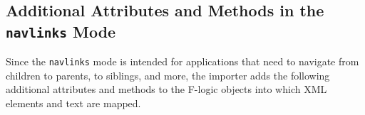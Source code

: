 

\subsection{Additional Attributes and Methods in the
  \texttt{navlinks} Mode }

Since the \texttt{navlinks} mode is intended for applications that need to
navigate from children to parents, to siblings, and more, the importer
adds the following additional attributes and methods to the F-logic objects 
into which XML elements and text are mapped.

